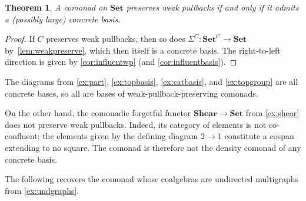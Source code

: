 \documentclass[11pt, oneside, article]{memoir}
\theoremstyle{plain}
\newtheorem{theorem}{Theorem}[section]
\theoremstyle{definition}
\theoremstyle{remark}
\newenvironment{example}
{\renewcommand\qedsymbol{$\lrcorner$}%
  \pushQED{\qed}\myexample}
{\popQED\endmyexample}
\newcommand{\namedcat}[1]{\mathbf{#1}}
\newcommand{\Set}{\namedcat{Set}}
\newcommand{\Shear}{\namedcat{Shear}}
\newcommand{\CoalgOn}[2]{{#2}^{#1}}
\newcommand{\CoalgSet}[1]{\CoalgOn{#1}{\Set}}
\newcommand{\carr}{\Sigma}
\newcommand{\car}[1]{\carr^{#1}}
\newcommand{\carC}{\car{\cC}}
\newcommand{\cmnd}[1]{{#1}}
\newcommand{\cC}{\cmnd{C}}
\newcommand{\CSet}{\CoalgSet{\cC}}
\begin{document}
\begin{theorem}\label{cor:wpb}
  A comonad on $\Set$ preserves weak pullbacks if and only if it
  admits a (possibly large) concrete basis.
\end{theorem}
\begin{proof}
  If $\cC$ preserves weak pullbacks, then so does
  $\carC \colon \CSet \to \Set$ by~\cref{lem:weakpreserve}, which then
  itself is a concrete basis. The right-to-left direction is given by
  \cref{cor:influentwp} (and \cref{cor:influentbasis}).
\end{proof}

\begin{example}
  The diagrams from \cref{ex:part}, \cref{ex:topbasis},
  \cref{ex:catbasis}, and \cref{ex:topgroup} are all concrete bases,
  so all are bases of weak-pullback-preserving comonads.
  
  On the other hand, the comonadic forgetful functor $\Shear \to \Set$
  from \cref{ex:shear} does not preserve weak pullbacks. Indeed, its
  category of elements is not co-confluent: the elements given by the
  defining diagram $2 \to 1$ constitute a cospan extending to no
  square. The comonad is therefore not the density comonad of any
  concrete basis.
\end{example}

The following recovers the comonad whose coalgebras are undirected
multigraphs from \cref{ex:undgraphs}.
\end{document}
